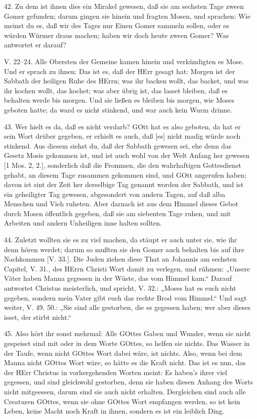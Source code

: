 42. Zu dem ist ihnen dies ein Mirakel gewesen, daß sie am sechsten Tage zween Gomer gefunden; darum gingen sie hinein und fragten Mosen, und sprachen: Wie meinst du es, daß wir des Tages nur Einen Gomer sammeln sollen, oder es würden Würmer draus machen; haben wir doch heute zween Gomer? Was antwortet er darauf?

\begin{schriftzitat}
V. 22–24. Alle Obersten der Gemeine kamen hinein und verkündigten es Mose. Und er sprach zu ihnen: Das ist es, daß der HErr gesagt hat: Morgen ist der Sabbath der heiligen Ruhe des HErrn; was ihr backen wollt, das backet, und was ihr kochen wollt, das kochet; was aber übrig ist, das lasset bleiben, daß es behalten werde bis morgen. Und sie ließen es bleiben bis morgen, wie Moses geboten hatte; da ward es nicht stinkend, und war auch kein Wurm drinne.
\end{schriftzitat}

43. Wer hielt es da, daß es nicht verdarb? GOtt hat es also geboten, da hat er sein Wort drüber gegeben, er erhielt es auch, daß [es] nicht madig würde noch stinkend. Aus diesem siehst du, daß der Sabbath gewesen sei, ehe denn das Gesetz Mosis gekommen ist, und ist auch wohl von der Welt Anfang her gewesen [1 Mos. 2, 2.], sonderlich daß die Frommen, die den wahrhaftigen Gottesdienst gehabt, an diesem Tage zusammen gekommen sind, und GOtt angerufen haben; davon ist sint der Zeit her derselbige Tag genannt worden der Sabbath, und ist ein geheiligter Tag gewesen, abgesondert von andern Tagen, auf daß alba Menschen und Vieh ruheten. Aber darnach ist aus dem Himmel dieses Gebot durch Mosen öffentlich gegeben, daß sie am siebenten Tage ruhen, und mit Arbeiten und andern Unheiligen inne halten sollten.

44. Zuletzt wollten sie es zu viel machen, da stäupt er auch unter sie, wie ihr denn hören werdet; darum so mußten sie den Gomer auch behalten bis auf ihre Nachkommen [V. 33.]. Die Juden ziehen diese That an Johannis am sechsten Capitel, V. 31., des HErrn Christi Wort damit zu verlegen, und rühmen: „Unsere Väter haben Manna gegessen in der Wüste, das vom Himmel kam.“ Darauf antwortet Christus meisterlich, und spricht, V. 32.: „Moses hat es euch nicht gegeben, sondern mein Vater gibt euch das rechte Brod vom Himmel.“ Und sagt weiter, V. 49. 50.: „Sie sind alle gestorben, die es gegessen haben; wer aber dieses isset, der stirbt nicht.“

45. Also hört ihr sonst mehrmal: Alle GOttes Gaben und Wunder, wenn sie nicht gespeiset sind mit oder in dem Worte GOttes, so helfen sie nichts. Das Wasser in der Taufe, wenn nicht GOttes Wort dabei wäre, ist nichts. Also, wenn bei dem Manna nicht GOttes Wort wäre, so hätte es die Kraft nicht. Das ist es nun, das der HErr Christus in vorhergehenden Worten meint: Es haben’s ihrer viel gegessen, und sind gleichwohl gestorben, denn sie haben diesen Anhang des Worts nicht mitgeessen, darum sind sie auch nicht erhalten. Dergleichen sind auch alle Creaturen GOttes, wenn sie ohne GOttes Wort empfangen werden, so ist kein Leben, keine Macht noch Kraft in ihnen, sondern es ist ein leiblich Ding.

